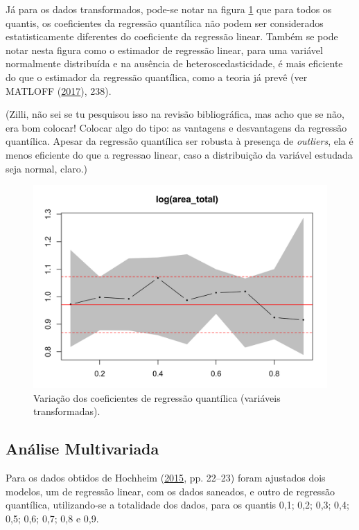 \documentclass[a4paper, 12pt]{article}
\begin{document}
Já para os dados transformados, pode-se notar na figura \ref{fig:coef2}
que para todos os quantis, os coeficientes da regressão quantílica não
podem ser considerados estatisticamente diferentes do coeficiente da
regressão linear. Também se pode notar nesta figura como o estimador de
regressão linear, para uma variável normalmente distribuída e na
ausência de heteroscedasticidade, é mais eficiente do que o estimador da
regressão quantílica, como a teoria já prevê (ver MATLOFF
(\protect\hyperlink{ref-matloff2017}{2017}), 238).

(Zilli, não sei se tu pesquisou isso na revisão bibliográfica, mas acho
que se não, era bom colocar! Colocar algo do tipo: as vantagens e
desvantagens da regressão quantílica. Apesar da regressão quantílica ser
robusta à presença de \emph{outliers}, ela é menos eficiente do que a
regressao linear, caso a distribuição da variável estudada seja normal,
claro.)

\begin{figure}[H]

{\centering \includegraphics[width=0.7\linewidth]{images/coef2-1} 

}

\caption{Variação dos coeficientes de regressão quantílica (variáveis transformadas).}\label{fig:coef2}
\end{figure}

\hypertarget{analise-multivariada}{%
\subsection{Análise Multivariada}\label{analise-multivariada}}

Para os dados obtidos de Hochheim
(\protect\hyperlink{ref-hochheim}{2015}, pp. 22--23) foram ajustados
dois modelos, um de regressão linear, com os dados saneados, e outro de
regressão quantílica, utilizando-se a totalidade dos dados, para os
quantis 0,1; 0,2; 0,3; 0,4; 0,5; 0,6; 0,7; 0,8 e 0,9.
\end{document}
